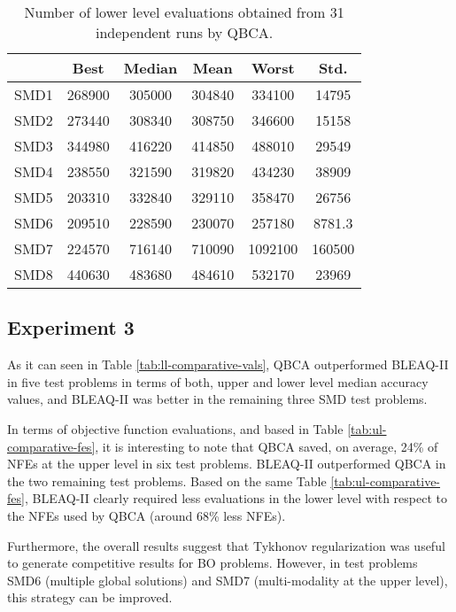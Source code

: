 \documentclass[conference]{IEEEtran}
\theoremstyle{definition}
\begin{document}
\begin{table}[htbp]
    \caption{Number of lower level evaluations obtained from 31 independent runs by QBCA.}
    \label{tab:ll-evals}
    \centering
    \begin{tabular}{cccccc}
        \hline
        & Best &  Median &  Mean &  Worst &  Std. \\ \hline
        SMD1 & 268900 & 305000 & 304840 & 334100 & 14795 \\ \hline 
        SMD2 & 273440 & 308340 & 308750 & 346600 & 15158 \\ \hline 
        SMD3 & 344980 & 416220 & 414850 & 488010 & 29549 \\ \hline 
        SMD4 & 238550 & 321590 & 319820 & 434230 & 38909 \\ \hline 
        SMD5 & 203310 & 332840 & 329110 & 358470 & 26756 \\ \hline 
        SMD6 & 209510 & 228590 & 230070 & 257180 & 8781.3 \\ \hline 
        SMD7 & 224570 & 716140 & 710090 & 1092100 & 160500 \\ \hline 
        SMD8 & 440630 & 483680 & 484610 & 532170 & 23969 \\ \hline 
    \end{tabular}
\end{table}


\subsection{Experiment 3}
As it can seen in Table \ref{tab:ll-comparative-vals}, QBCA outperformed BLEAQ-II
in five test problems in terms of both, upper and lower level median accuracy
values, and BLEAQ-II was better in the remaining three SMD test problems. 

In terms of objective function evaluations, and based in Table \ref{tab:ul-comparative-fes},
it is interesting to note that QBCA saved, on average, 24\% of NFEs at the upper
level in six test problems. BLEAQ-II outperformed QBCA in the two remaining test
problems. Based on the same Table \ref{tab:ul-comparative-fes}, BLEAQ-II clearly
required less evaluations in the lower level with respect to the NFEs used by
QBCA (around 68\% less NFEs). 

Furthermore, the overall results suggest that Tykhonov regularization was useful
to generate competitive results for BO problems. However, in test problems SMD6
(multiple global solutions) and SMD7 (multi-modality at the upper level), this
strategy can be improved.
\end{document}
